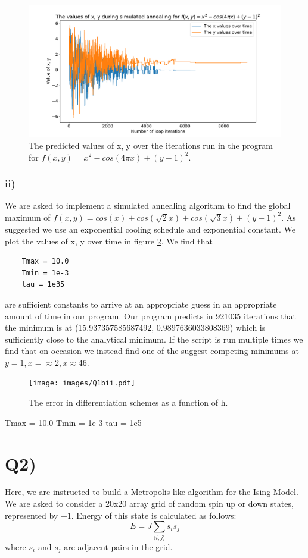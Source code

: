 \documentclass{article}
\begin{document}
\begin{figure}[H]
    \centerline{\includegraphics[scale=0.6]{images/Q1bi.pdf}}
    \caption{The predicted values of x, y over the iterations run in the program for $f(x, y) = x^2 - cos(4 \pi x) + (y - 1)^2$.}
    \label{fig:1bi}
\end{figure}


\subsubsection*{ii)}
We are asked to implement a simulated annealing algorithm to find the global maximum of $f(x, y) = cos(x) + cos(\sqrt{2} x)+ cos(\sqrt{3} x) + (y - 1)^2$. As suggested we use an exponential cooling schedule and exponential constant. We plot the values of x, y over time in figure \ref{fig:1bii}. We find that 
\begin{verbatim}
    Tmax = 10.0
    Tmin = 1e-3
    tau = 1e35   
\end{verbatim}
are sufficient constants to arrive at an appropriate guess in an appropriate amount of time in our program. Our program predicts in 921035 iterations that the minimum is at (15.937357585687492, 0.9897636033808369) which is sufficiently close to the analytical minimum. If the script is run multiple times we find that on occasion we instead find one of the suggest competing minimums at $y = 1, x =\approx 2, x \approx 46$. 

\begin{figure}[H]
    \centerline{\texttt{[image: images/Q1bii.pdf]}}
    \caption{The error in differentiation schemes as a function of h.}
    \label{fig:1bii}
\end{figure}

Tmax = 10.0
Tmin = 1e-3
tau = 1e5


\newpage
\section*{Q2)}
Here, we are instructed to build a Metropolis-like algorithm for the Ising Model. We are asked to consider a 20x20 array grid of random spin up or down states, represented by $\pm 1$. Energy of this state is calculated as follows: 
\[E = J \sum_{\langle i, j \rangle} s_i s_j \]
where $s_i$ and $s_j$ are adjacent pairs in the grid. 
\end{document}
